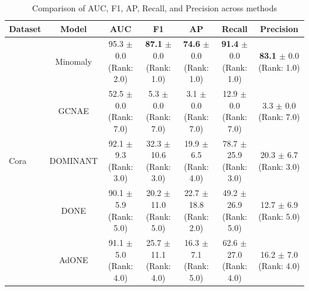 \begin{table}[H]
    \footnotesize
    \centering
    \caption{Comparison of AUC, F1, AP, Recall, and Precision across methods}
    \label{tab:bench_results}
    \begin{tabular}{|l|c|c|c|c|c|c|}
    \hline
    Dataset & Model & AUC & F1 & AP & Recall & Precision \\ \hline
    \multirow{7}{*}{Cora} 
    & Minomaly & \makecell{95.3 $\pm$ 0.0 \\[0.3pt] \tiny (Rank: 2.0)} & \makecell{\textbf{87.1} $\pm$ 0.0 \\[0.3pt] \tiny (Rank: 1.0)} & \makecell{\textbf{74.6} $\pm$ 0.0 \\[1pt] \tiny (Rank: 1.0)} & \makecell{\textbf{91.4} $\pm$ 0.0 \\[1pt] \tiny (Rank: 1.0)} & \makecell{\textbf{83.1} $\pm$ 0.0 \\[1pt] \tiny (Rank: 1.0)} \\
    & GCNAE & \makecell{52.5 $\pm$ 0.0 \\[1pt] \tiny (Rank: 7.0)} & \makecell{5.3 $\pm$ 0.0 \\[1pt] \tiny (Rank: 7.0)} & \makecell{3.1 $\pm$ 0.0 \\[1pt] \tiny (Rank: 7.0)} & \makecell{12.9 $\pm$ 0.0 \\[1pt] \tiny (Rank: 7.0)} & \makecell{3.3 $\pm$ 0.0 \\[1pt] \tiny (Rank: 7.0)} \\
    & DOMINANT & \makecell{92.1 $\pm$ 9.3 \\[1pt] \tiny (Rank: 3.0)} & \makecell{32.3 $\pm$ 10.6 \\[1pt] \tiny (Rank: 3.0)} & \makecell{19.9 $\pm$ 6.5 \\[1pt] \tiny (Rank: 4.0)} & \makecell{78.7 $\pm$ 25.9 \\[1pt] \tiny (Rank: 3.0)} & \makecell{20.3 $\pm$ 6.7 \\[1pt] \tiny (Rank: 3.0)} \\
    & DONE & \makecell{90.1 $\pm$ 5.9 \\[1pt] \tiny (Rank: 5.0)} & \makecell{20.2 $\pm$ 11.0 \\[1pt] \tiny (Rank: 5.0)} & \makecell{22.7 $\pm$ 18.8 \\[1pt] \tiny (Rank: 2.0)} & \makecell{49.2 $\pm$ 26.9 \\[1pt] \tiny (Rank: 5.0)} & \makecell{12.7 $\pm$ 6.9 \\[1pt] \tiny (Rank: 5.0)} \\
    & AdONE & \makecell{91.1 $\pm$ 5.0 \\[1pt] \tiny (Rank: 4.0)} & \makecell{25.7 $\pm$ 11.1 \\[1pt] \tiny (Rank: 4.0)} & \makecell{16.3 $\pm$ 7.1 \\[1pt] \tiny (Rank: 5.0)} & \makecell{62.6 $\pm$ 27.0 \\[1pt] \tiny (Rank: 4.0)} & \makecell{16.2 $\pm$ 7.0 \\[1pt] \tiny (Rank: 4.0)} \\

\end{tabular}
\end{table}
